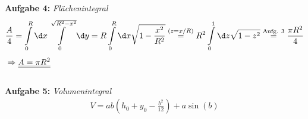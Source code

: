 \textbf{Aufgabe 4: } \emph{Flächenintegral}
\begin{align*}
&\frac{A}{4}=\int\limits_0^R \d x \int\limits_0^{\sqrt{R^2-x^2}}\d y=R\int\limits_0^R\d x\sqrt{1-\frac{x^2}{R^2}}\stackrel{(z=x/R)}{=}R^2\int\limits_0^1 \d z\sqrt{1-z^2}\stackrel{\text{Aufg. 3}}{=}\frac{\pi R^2}{4}\\[1ex]
&\Rightarrow \underline{\underline{A=\pi R^2}}
\end{align*}\\[0.2cm]
%
\textbf{Aufgabe 5: } \emph{Volumenintegral}
\begin{align*}
V=ab\left(h_0+y_0-\frac{b^2}{12}\right)+a\sin(b)
\end{align*}